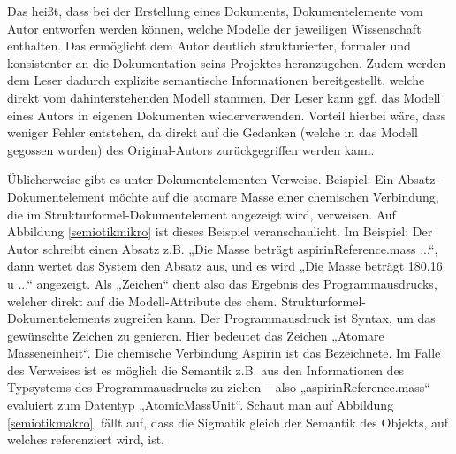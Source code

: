  
Das heißt, dass bei der Erstellung eines Dokuments, Dokumentelemente vom Autor entworfen werden können, welche Modelle der jeweiligen Wissenschaft enthalten. Das ermöglicht dem Autor deutlich strukturierter, formaler und konsistenter an die Dokumentation seins Projektes heranzugehen. Zudem werden dem Leser dadurch explizite semantische Informationen bereitgestellt, welche direkt vom dahinterstehenden Modell stammen. Der Leser kann ggf. das Modell eines Autors in eigenen Dokumenten wiederverwenden. Vorteil hierbei wäre, dass weniger Fehler entstehen, da direkt auf die Gedanken (welche in das Modell gegossen wurden) des Original-Autors zurückgegriffen werden kann.

 
Üblicherweise gibt es unter Dokumentelementen Verweise. Beispiel: Ein Absatz-Dokumentelement möchte auf die atomare Masse einer chemischen Verbindung, die im Strukturformel-Dokumentelement angezeigt wird, verweisen. Auf Abbildung \ref{semiotikmikro} ist dieses Beispiel veranschaulicht. Im Beispiel: Der Autor schreibt einen Absatz z.B. „Die Masse beträgt { aspirinReference.mass } ...“, dann wertet das System den Absatz aus, und es wird „Die Masse beträgt 180,16 u ...“ angezeigt. Als „Zeichen“ dient also das Ergebnis des Programmausdrucks, welcher direkt auf die Modell-Attribute des chem. Strukturformel-Dokumentelements zugreifen kann. Der Programmausdruck ist Syntax, um das gewünschte Zeichen zu genieren. Hier bedeutet das Zeichen „Atomare Masseneinheit“. Die chemische Verbindung Aspirin ist das Bezeichnete. Im Falle des Verweises ist es möglich die Semantik z.B. aus den Informationen des Typsystems des Programmausdrucks zu ziehen -- also „aspirinReference.mass“ evaluiert zum Datentyp „AtomicMassUnit“. Schaut man auf Abbildung \ref{semiotikmakro}, fällt auf, dass die Sigmatik gleich der Semantik des Objekts, auf welches referenziert wird, ist.


